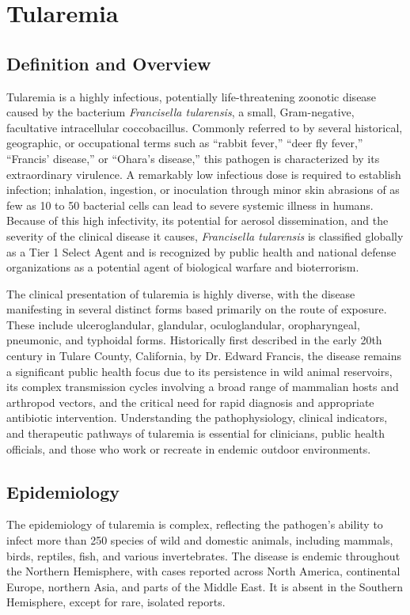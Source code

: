\chapter{Tularemia}

\section*{Definition and Overview}
Tularemia is a highly infectious, potentially life-threatening zoonotic disease caused by the bacterium \textit{Francisella tularensis}, a small, Gram-negative, facultative intracellular coccobacillus. Commonly referred to by several historical, geographic, or occupational terms such as ``rabbit fever,'' ``deer fly fever,'' ``Francis' disease,'' or ``Ohara's disease,'' this pathogen is characterized by its extraordinary virulence. A remarkably low infectious dose is required to establish infection; inhalation, ingestion, or inoculation through minor skin abrasions of as few as 10 to 50 bacterial cells can lead to severe systemic illness in humans. Because of this high infectivity, its potential for aerosol dissemination, and the severity of the clinical disease it causes, \textit{Francisella tularensis} is classified globally as a Tier 1 Select Agent and is recognized by public health and national defense organizations as a potential agent of biological warfare and bioterrorism.

The clinical presentation of tularemia is highly diverse, with the disease manifesting in several distinct forms based primarily on the route of exposure. These include ulceroglandular, glandular, oculoglandular, oropharyngeal, pneumonic, and typhoidal forms. Historically first described in the early 20th century in Tulare County, California, by Dr. Edward Francis, the disease remains a significant public health focus due to its persistence in wild animal reservoirs, its complex transmission cycles involving a broad range of mammalian hosts and arthropod vectors, and the critical need for rapid diagnosis and appropriate antibiotic intervention. Understanding the pathophysiology, clinical indicators, and therapeutic pathways of tularemia is essential for clinicians, public health officials, and those who work or recreate in endemic outdoor environments.

\section*{Epidemiology}
The epidemiology of tularemia is complex, reflecting the pathogen's ability to infect more than 250 species of wild and domestic animals, including mammals, birds, reptiles, fish, and various invertebrates. The disease is endemic throughout the Northern Hemisphere, with cases reported across North America, continental Europe, northern Asia, and parts of the Middle East. It is absent in the Southern Hemisphere, except for rare, isolated reports.

